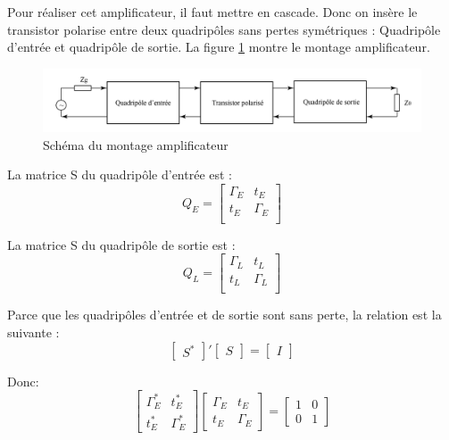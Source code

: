 \documentclass[french]{article}
\begin{document}
Pour réaliser cet amplificateur, il faut mettre en cascade. Donc on insère le transistor polarise entre deux quadripôles sans pertes symétriques : Quadripôle d’entrée et quadripôle de sortie. La figure \ref{fig:schema_ampli} montre le montage amplificateur. 
\begin{figure}[H]
	\centering
	\includegraphics[width=0.9\linewidth]{../5SynthAmp/Schema_ampli}
	\caption{Schéma du montage amplificateur}
	\label{fig:schema_ampli}
\end{figure}

La matrice S du quadripôle d’entrée est :
\begin{equation}
	Q_{E} = \begin{bmatrix}
		\Gamma_{E} & t_{E}\\
		t_{E} & \Gamma_{E}\\
	\end{bmatrix}
\end{equation}

La matrice S du quadripôle de sortie est :
\begin{equation}
	Q_{L} = \begin{bmatrix}
		\Gamma_{L} & t_{L}\\
		t_{L} & \Gamma_{L}\\
	\end{bmatrix}
\end{equation}

Parce que les quadripôles d'entrée et de sortie sont sans perte, la relation est la suivante :
\begin{equation}
	{\begin{bmatrix}
		S^\ast 
	\end{bmatrix}}'
	\begin{bmatrix}
		S
	\end{bmatrix}=
	\begin{bmatrix}
		I
	\end{bmatrix}
\end{equation}

Donc:
\begin{equation}
	\begin{bmatrix}
		\Gamma_{E}^\ast & t_{E}^\ast\\
		t_{E}^\ast & \Gamma_{E}^\ast
	\end{bmatrix}
	\begin{bmatrix}
		\Gamma_{E} & t_{E}\\
		t_{E} & \Gamma_{E}
	\end{bmatrix}=
	\begin{bmatrix}
		1 & 0\\
		0 & 1
	\end{bmatrix}
\end{equation}
\end{document}
